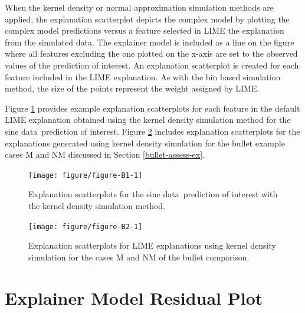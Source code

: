 \documentclass[AMS,STIX2COL]{WileyNJD-v2}\usepackage[]{graphicx}\usepackage[]{color}
\newenvironment{knitrout}{}{} %
\newcommand{\data}{sine data}
\begin{document}
When the kernel density or normal approximation simulation methods are applied, the explanation scatterplot depicts the complex model by plotting the complex model predictions versus a feature selected in LIME the explanation from the simulated data. The explainer model is included as a line on the figure where all features excluding the one plotted on the x-axis are set to the observed values of the prediction of interest. An explanation scatterplot is created for each feature included in the LIME explanation. As with the bin based simulation method, the size of the points represent the weight assigned by LIME.

Figure \ref{fig:figure-B1} provides example explanation scatterplots for each feature in the default LIME explanation obtained using the kernel density simulation method for the \data \ prediction of interest. Figure \ref{fig:figure-B2} includes explanation scatterplots for the explanations generated using kernel density simulation for the bullet example cases M and NM discussed in Section \ref{bullet-assess-ex}.

\begin{figure}[!thp]
\begin{knitrout}
\color{fgcolor}

{\centering \texttt{[image: figure/figure-B1-1]} 

}



\end{knitrout}
\caption{Explanation scatterplots for the \data \ prediction of interest with the kernel density simulation method.}
\label{fig:figure-B1}
\end{figure}

\begin{figure}[!thp]
\begin{knitrout}
\color{fgcolor}

{\centering \texttt{[image: figure/figure-B2-1]} 

}



\end{knitrout}
\caption{Explanation scatterplots for LIME explanations using kernel density simulation for the cases M and NM of the bullet comparison.}
\label{fig:figure-B2}
\end{figure}

\section{Explainer Model Residual Plot} \label{residual-plot}
\end{document}
